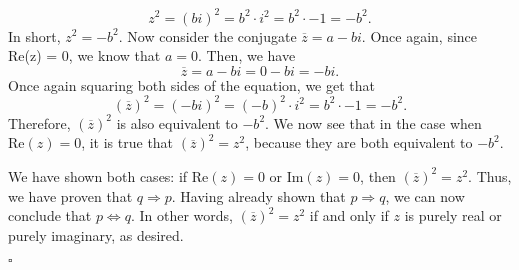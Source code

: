 \documentclass[12pt]{exam}
\begin{document}
\begin{questions}
\begin{parts}
\begin{equation*}
z^2 = (bi)^2 = b^2 \cdot i^2 = b^2 \cdot -1 = -b^2. 
\end{equation*}
In short, $z^2 = -b^2$. Now consider the conjugate $\overline z = a - bi$. Once again, since Re(z) = 0, we know that $a = 0$. Then, we have $$\overline z = a - bi = 0 - bi = -bi.$$ Once again squaring both sides of the equation, we get that 
\begin{equation*}
\left(\overline z\right)^2 = (-bi)^2 = (-b)^2 \cdot i^2 = b^2 \cdot -1 = -b^2. 
\end{equation*}
Therefore, $\left(\overline z\right)^2$ is also equivalent to $-b^2$. We now see that in the case when $\textrm{Re}(z) = 0$, it is true that $\left(\overline z\right)^2 = z^2$, because they are both equivalent to $-b^2$.
\par
We have shown both cases: if $\textrm{Re}(z) = 0$ or $\textrm{Im}(z) = 0$, then $\left(\overline z\right)^2 = z^2$. Thus, we have proven that  $q \Rightarrow p$. Having already shown that $p \Rightarrow q$, we can now conclude that $p \Leftrightarrow q$. In other words, $\left(\overline z\right)^2 = z^2$ if and only if $z$ is purely real or purely imaginary, as desired.
\begin{flushright}
$\square$
\end{flushright}
\end{parts}

\question
\begin{parts}

\end{parts}
\end{questions}
\end{document}
